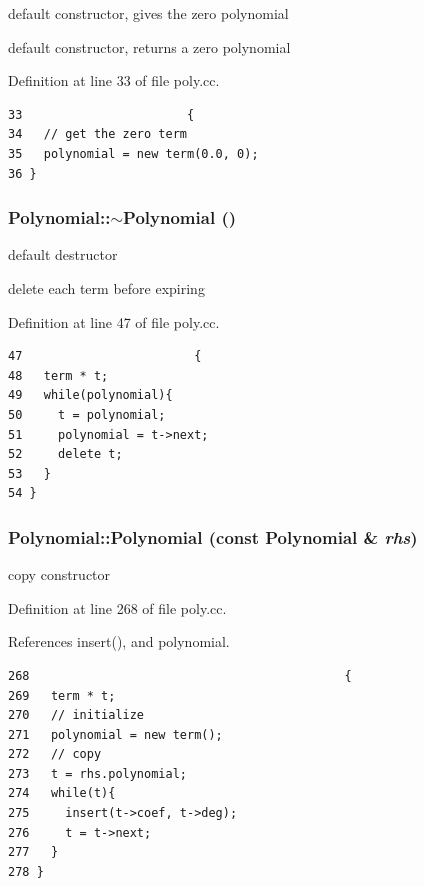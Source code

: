 default constructor, gives the zero polynomial

default constructor, returns a zero polynomial 

Definition at line 33 of file poly.cc.

\begin{Code}\begin{verbatim}33                       {
34   // get the zero term
35   polynomial = new term(0.0, 0);
36 }
\end{verbatim}
\end{Code}


\hypertarget{classPolynomial_96130e913259691bd82b7d910d586169}{
\subsubsection[$\sim$Polynomial]{\setlength{\rightskip}{0pt plus 5cm}Polynomial::$\sim$Polynomial ()}}
\label{classPolynomial_96130e913259691bd82b7d910d586169}


default destructor

delete each term before expiring 

Definition at line 47 of file poly.cc.

\begin{Code}\begin{verbatim}47                        {
48   term * t;
49   while(polynomial){
50     t = polynomial;
51     polynomial = t->next;
52     delete t;
53   }
54 }
\end{verbatim}
\end{Code}


\hypertarget{classPolynomial_fa571a95bc93973b6727e4bdbda7a43d}{
\subsubsection[Polynomial]{\setlength{\rightskip}{0pt plus 5cm}Polynomial::Polynomial (const {\bf Polynomial} \& {\em rhs})}}
\label{classPolynomial_fa571a95bc93973b6727e4bdbda7a43d}


copy constructor 

Definition at line 268 of file poly.cc.

References insert(), and polynomial.

\begin{Code}\begin{verbatim}268                                            {
269   term * t;
270   // initialize
271   polynomial = new term();
272   // copy
273   t = rhs.polynomial;
274   while(t){
275     insert(t->coef, t->deg);
276     t = t->next;
277   }
278 }
\end{verbatim}
\end{Code}




